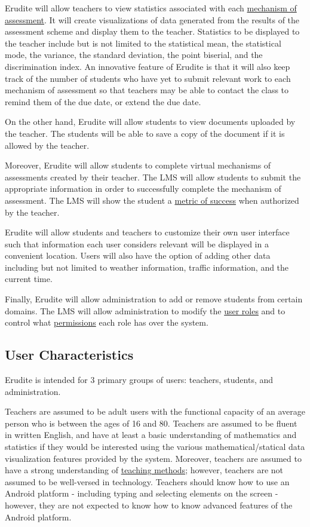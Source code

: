\documentclass[]{article}
\begin{document}
Erudite will allow teachers to view statistics associated with each
\underline{mechanism of assessment}. It will create visualizations of data
generated from the results of the assessment scheme and display them to the
teacher. Statistics to be displayed to the teacher include but is not limited
to the statistical mean, the statistical mode, the variance, the standard
deviation, the point biserial, and the discrimination index. \color{blue} An
innovative feature of Erudite is that it will also keep track of the number of
students who have yet to submit relevant work to each mechanism of assessment
so that teachers may be able to contact the class to remind them of the due
date, or extend the due date.\color{black}

On the other hand, Erudite will allow students to view documents uploaded by
the teacher. The students will be able to save a copy of the document if it is
allowed by the teacher.

Moreover, Erudite will allow students to complete virtual mechanisms of
assessments created by their teacher. The LMS will allow students to submit the
appropriate information in order to successfully complete the mechanism of
assessment. The LMS will show the student a \underline{metric of success} when
authorized by the teacher.

\color{blue}

Erudite will allow students and teachers to customize their own user
interface such that information each user considers relevant will be displayed
in a convenient location. Users will also have the option of adding other data
including but not limited to weather information, traffic information, and the
current time.

\color{black}

Finally, Erudite will allow administration to add or remove students from
certain domains. The LMS will allow administration to modify the
\underline{user roles} and to control what \underline{permissions} each role
has over the system.

\subsection{User Characteristics}
\label{sub:user_characteristics}
Erudite is intended for 3 primary groups of users: teachers, students, and
administration.

Teachers are assumed to be adult users with the functional capacity of an
average person who is between the ages of 16 and 80. Teachers are assumed to be
fluent in written English, and have at least a basic understanding of
mathematics and statistics if they would be interested using the various
mathematical/statical data visualization features provided by the system.
Moreover, teachers are assumed to have a strong understanding of
\underline{teaching methods}; however, teachers are not assumed to be
well-versed in technology. Teachers should know how to use an Android platform
- including typing and selecting elements on the screen - however, they are not
expected to know how to know advanced features of the Android platform.
\end{document}
